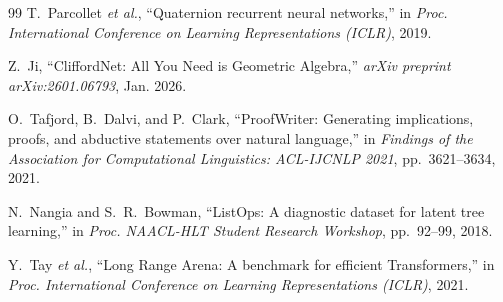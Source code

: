 \documentclass[11pt,a4paper]{article}
\theoremstyle{definition}
\theoremstyle{remark}
\begin{document}
\begin{thebibliography}{99}
T.~Parcollet \emph{et al.}, ``Quaternion recurrent neural networks,'' in \emph{Proc. International Conference on Learning Representations (ICLR)}, 2019.

Z.~Ji, ``CliffordNet: All You Need is Geometric Algebra,'' \emph{arXiv preprint arXiv:2601.06793}, Jan. 2026.

O.~Tafjord, B.~Dalvi, and P.~Clark, ``ProofWriter: Generating implications, proofs, and abductive statements over natural language,'' in \emph{Findings of the Association for Computational Linguistics: ACL-IJCNLP 2021}, pp.~3621--3634, 2021.

N.~Nangia and S.~R.~Bowman, ``ListOps: A diagnostic dataset for latent tree learning,'' in \emph{Proc. NAACL-HLT Student Research Workshop}, pp.~92--99, 2018.

Y.~Tay \emph{et al.}, ``Long Range Arena: A benchmark for efficient Transformers,'' in \emph{Proc. International Conference on Learning Representations (ICLR)}, 2021.

\end{thebibliography}
\end{document}
